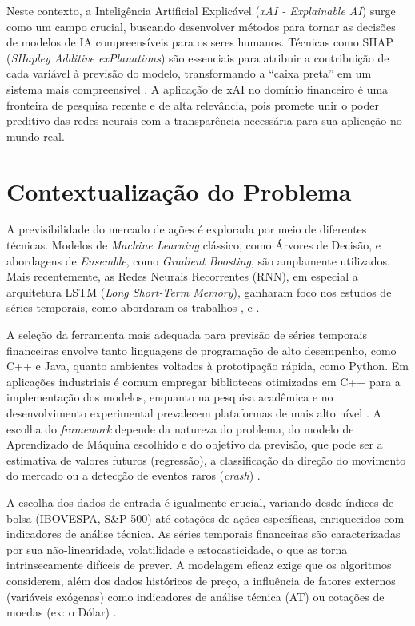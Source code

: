 Neste contexto, a Inteligência Artificial Explicável (\textit{xAI - Explainable AI}) surge como um campo crucial, buscando desenvolver métodos para tornar as decisões de modelos de IA compreensíveis para os seres humanos. Técnicas como SHAP (\textit{SHapley Additive exPlanations}) são essenciais para atribuir a contribuição de cada variável à previsão do modelo, transformando a ``caixa preta'' em um sistema mais compreensível \cite{Ayatollahi2025XAIStockCrashes}. A aplicação de xAI no domínio financeiro é uma fronteira de pesquisa recente e de alta relevância, pois promete unir o poder preditivo das redes neurais com a transparência necessária para sua aplicação no mundo real.


\section{Contextualização do Problema}

A previsibilidade do mercado de ações é explorada por meio de diferentes técnicas. Modelos de \textit{Machine Learning} clássico, como Árvores de Decisão, e abordagens de \textit{Ensemble}, como \textit{Gradient Boosting}, são amplamente utilizados. Mais recentemente, as Redes Neurais Recorrentes (RNN), em especial a arquitetura LSTM (\textit{Long Short-Term Memory}), ganharam foco nos estudos de séries temporais, como abordaram os trabalhos ,  e .

A seleção da ferramenta mais adequada para previsão de séries temporais financeiras envolve tanto linguagens de programação de alto desempenho, como C++ e Java, quanto ambientes voltados à prototipação rápida, como Python. Em aplicações industriais é comum empregar bibliotecas otimizadas em C++ para a implementação dos modelos, enquanto na pesquisa acadêmica e no desenvolvimento experimental prevalecem plataformas de mais alto nível \cite{site9}. A escolha do \textit{framework} depende da natureza do problema, do modelo de Aprendizado de Máquina escolhido e do objetivo da previsão, que pode ser a estimativa de valores futuros (regressão), a classificação da direção do movimento do mercado ou a detecção de eventos raros (\textit{crash}) \cite{site6}.

A escolha dos dados de entrada é igualmente crucial, variando desde índices de bolsa (IBOVESPA, S\&P 500) até cotações de ações específicas, enriquecidos com indicadores de análise técnica. As séries temporais financeiras são caracterizadas por sua não-linearidade, volatilidade e estocasticidade, o que as torna intrinsecamente difíceis de prever. A modelagem eficaz exige que os algoritmos considerem, além dos dados históricos de preço, a influência de fatores externos (variáveis exógenas) como indicadores de análise técnica (AT) ou cotações de moedas (ex: o Dólar) \cite{Dametto2018EstudoRN}.

